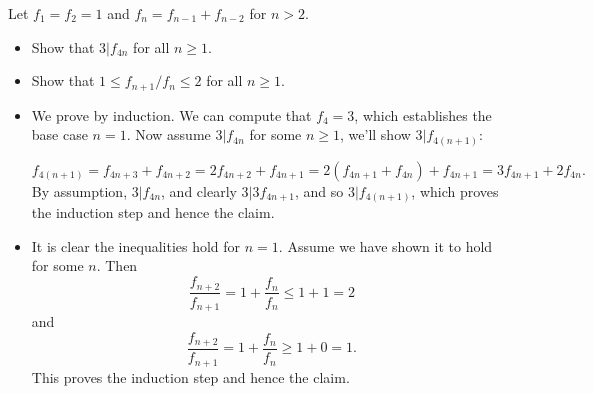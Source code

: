 \documentclass[11pt,dvipsnames]{book}
\numberwithin{equation}{section} %
\numberwithin{figure}{section} %
\numberwithin{table}{section} %
\begin{document}
\begin{exercise}  Let $f_{1}=f_{2}=1$ and $f_{n}=f_{n-1}+f_{n-2}$ for $n>2$. 
\begin{itemize}
\item Show that $3|f_{4n}$ for all $n\geq 1$. 
\item Show that $1\leq f_{n+1}/f_{n}\leq 2$ for all $n\geq 1$. 
\end{itemize}
\end{exercise}

\begin{solution}
\begin{itemize}
\item We prove by induction. We can compute that $f_{4}=3$, which establishes the base case $n=1$. Now assume $3|f_{4n}$ for some $n\geq 1$, we'll show $3|f_{4(n+1)}$:

\[
f_{4(n+1)}=f_{4n+3}+f_{4n+2}
=2f_{4n+2}+f_{4n+1}
=2(f_{4n+1}+f_{4n})+f_{4n+1}
=3f_{4n+1}+2f_{4n}.
\]
By assumption, $3|f_{4n}$, and clearly $3|3f_{4n+1}$, and so $3|f_{4(n+1)}$, which proves the induction step and hence the claim. 

\item It is clear the inequalities hold for $n=1$. Assume we have shown it to hold for some $n$. Then
\[
\frac{f_{n+2}}{f_{n+1}}=1+\frac{f_{n}}{f_{n}}\leq 1+1=2
\]
and 
\[
\frac{f_{n+2}}{f_{n+1}}=1+\frac{f_{n}}{f_{n}}\geq 1+0=1.\]
This proves the induction step and hence the claim. 
\end{itemize}
\end{solution}


%
\end{document}
